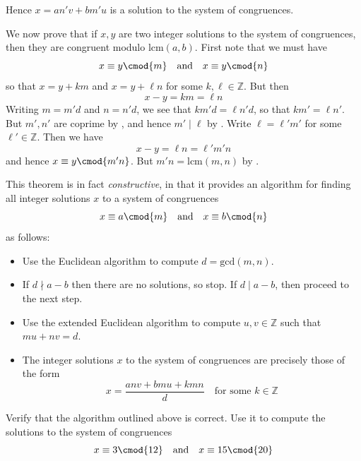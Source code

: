 \begin{cproof}
\begin{itemize}
Hence $x = an'v+bm'u$ is a solution to the system of congruences.
\end{itemize}

We now prove that if $x,y$ are two integer solutions to the system of congruences, then they are congruent modulo $\mathrm{lcm}(a,b)$. First note that we must have
\[ x \equiv y \cmod{m} \quad \text{and} \quad x \equiv y \cmod{n} \]
so that $x=y+km$ and $x=y+\ell n$ for some $k,\ell \in \mathbb{Z}$. But then
\[ x-y=km=\ell n \]
Writing $m=m'd$ and $n=n'd$, we see that $km'd = \ell n'd$, so that $km' = \ell n'$. But $m',n'$ are coprime by , and hence $m' \mid \ell$ by . Write $\ell = \ell'm'$ for some $\ell' \in \mathbb{Z}$. Then we have
\[ x-y = \ell n = \ell' m' n \]
and hence $x \equiv y \cmod{m'n}$. But $m'n = \mathrm{lcm}(m,n)$ by .
\end{cproof}

This theorem is in fact \textit{constructive}, in that it provides an algorithm for finding all integer solutions $x$ to a system of congruences
\[ x \equiv a \cmod{m} \quad \text{and} \quad x \equiv b \cmod{n} \]
as follows:
\begin{itemize}
\item Use the Euclidean algorithm to compute $d=\mathrm{gcd}(m,n)$.
\item If $d \nmid a-b$ then there are no solutions, so stop. If $d \mid a-b$, then proceed to the next step.
\item Use the extended Euclidean algorithm to compute $u,v \in \mathbb{Z}$ such that $mu+nv=d$.
\item The integer solutions $x$ to the system of congruences are precisely those of the form
\[ x = \frac{anv + bmu + kmn}{d} \quad \text{for some } k \in \mathbb{Z} \]
\end{itemize}

\begin{exercise}
\label{exCRTAlgorithm}
Verify that the algorithm outlined above is correct. Use it to compute the solutions to the system of congruences
\[ x \equiv 3 \cmod{12} \quad \text{and} \quad x \equiv 15 \cmod{20} \]
\end{exercise}


